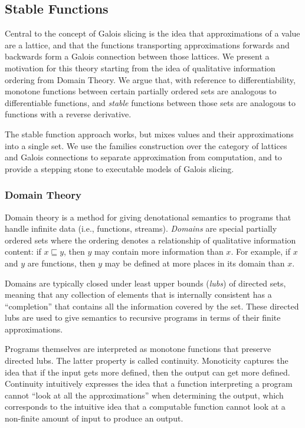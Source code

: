 \subsection{Stable Functions}
\label{sec:stable-functions}

Central to the concept of Galois slicing is the idea that
approximations of a value are a lattice, and that the functions
transporting approximations forwards and backwards form a Galois
connection between those lattices. We present a motivation for this
theory starting from the idea of qualitative information ordering from
Domain Theory. We argue that, with reference to differentiability,
monotone functions between certain partially ordered sets are
analogous to differentiable functions, and \emph{stable} functions
between those sets are analogous to functions with a reverse
derivative.

The stable function approach works, but mixes values and their
approximations into a single set. We use the families construction
over the category of lattices and Galois connections to separate
approximation from computation, and to provide a stepping stone to
executable models of Galois slicing.

\subsubsection{Domain Theory}

Domain theory is a method for giving denotational semantics to
programs that handle infinite data (i.e., functions,
streams). \emph{Domains} are special partially ordered sets where the
ordering denotes a relationship of qualitative information content: if
$x \sqsubseteq y$, then $y$ may contain more information than $x$. For
example, if $x$ and $y$ are functions, then $y$ may be defined at more
places in its domain than $x$.

Domains are typically closed under least upper bounds (\emph{lubs}) of
directed sets, meaning that any collection of elements that is
internally consistent has a ``completion'' that contains all the
information covered by the set. These directed lubs are used to give
semantics to recursive programs in terms of their finite
approximations.

Programs themselves are interpreted as monotone functions that
preserve directed lubs. The latter property is called
continuity. Monoticity captures the idea that if the input gets more
defined, then the output can get more defined. Continuity intuitively
expresses the idea that a function interpreting a program cannot
``look at all the approximations'' when determining the output, which
corresponds to the intuitive idea that a computable function cannot
look at a non-finite amount of input to produce an output.

